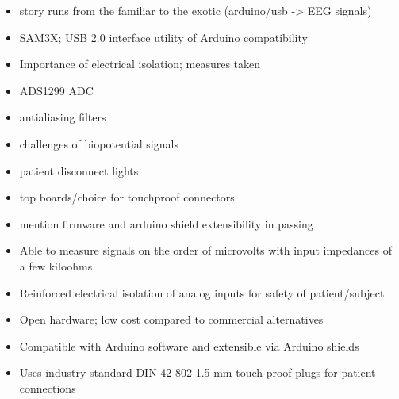 \documentclass[11pt, letterpaper]{article}
\begin{document}

\begin{itemize}
\item story runs from the familiar to the exotic (arduino/usb -> EEG signals)
\item SAM3X; USB 2.0 interface utility of Arduino compatibility
\item Importance of electrical isolation; measures taken
\item ADS1299 ADC
\item antialiasing filters
\item challenges of biopotential signals
\item patient disconnect lights
\item top boards/choice for touchproof connectors
\item mention firmware and arduino shield extensibility in passing
\end{itemize}

\begin{itemize}
\item Able to measure signals on the order of microvolts with input impedances of a few kiloohms
\item Reinforced electrical isolation of analog inputs for safety of patient/subject
\item Open hardware; low cost compared to commercial alternatives
\item Compatible with Arduino software and extensible via Arduino shields
\item Uses industry standard DIN 42 802 1.5 mm touch-proof plugs for patient connections
\end{itemize}
\end{document}
